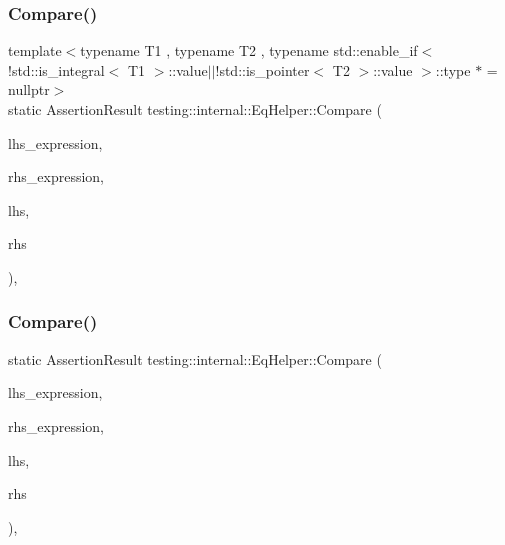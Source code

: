 \subsubsection{\texorpdfstring{Compare()}{Compare()}\hspace{0.1cm}{\footnotesize\ttfamily [1/3]}}
{\footnotesize\ttfamily template$<$typename T1 , typename T2 , typename std\+::enable\+\_\+if$<$!std\+::is\+\_\+integral$<$ T1 $>$\+::value$\vert$$\vert$!std\+::is\+\_\+pointer$<$ T2 $>$\+::value $>$\+::type $\ast$  = nullptr$>$ \\
static Assertion\+Result testing\+::internal\+::\+Eq\+Helper\+::\+Compare (\begin{DoxyParamCaption}\item[{const char $\ast$}]{lhs\+\_\+expression,  }\item[{const char $\ast$}]{rhs\+\_\+expression,  }\item[{const T1 \&}]{lhs,  }\item[{const T2 \&}]{rhs }\end{DoxyParamCaption})\hspace{0.3cm}{\ttfamily [inline]}, {\ttfamily [static]}}

\mbox{\label{classtesting_1_1internal_1_1EqHelper_af7e402f6e00be1486d0f102e9f1bc931}} 
\subsubsection{\texorpdfstring{Compare()}{Compare()}\hspace{0.1cm}{\footnotesize\ttfamily [2/3]}}
{\footnotesize\ttfamily static Assertion\+Result testing\+::internal\+::\+Eq\+Helper\+::\+Compare (\begin{DoxyParamCaption}\item[{const char $\ast$}]{lhs\+\_\+expression,  }\item[{const char $\ast$}]{rhs\+\_\+expression,  }\item[{\hyperlink{namespacetesting_1_1internal_a05c6bd9ede5ccdf25191a590d610dcc6}{Biggest\+Int}}]{lhs,  }\item[{\hyperlink{namespacetesting_1_1internal_a05c6bd9ede5ccdf25191a590d610dcc6}{Biggest\+Int}}]{rhs }\end{DoxyParamCaption})\hspace{0.3cm}{\ttfamily [inline]}, {\ttfamily [static]}}


